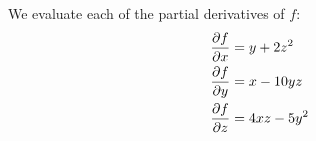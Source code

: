 \documentclass{homework}
\begin{document}
\maketitle


\begin{alphaparts}
    \questionpart
        We evaluate each of the partial derivatives of $f$:
        \begin{align*}
            \pdv{f}{x} &= y + 2z^2 \\
            \pdv{f}{y} &= x - 10yz \\
            \pdv{f}{z} &= 4xz - 5y^2
    \end{align*}
\end{alphaparts} 
\end{document}
